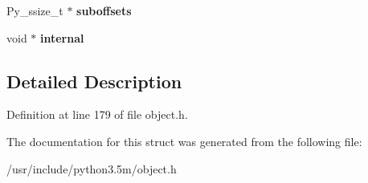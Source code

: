 \begin{DoxyCompactItemize}
\item 
Py\+\_\+ssize\+\_\+t $\ast$ {\bfseries suboffsets}\hypertarget{structbufferinfo_a74e3c815c56f515aa353109f4284f0e6}{}\label{structbufferinfo_a74e3c815c56f515aa353109f4284f0e6}

\item 
void $\ast$ {\bfseries internal}\hypertarget{structbufferinfo_ab238becb9fa7b6940afa059083e4d27e}{}\label{structbufferinfo_ab238becb9fa7b6940afa059083e4d27e}

\end{DoxyCompactItemize}


\subsection{Detailed Description}


Definition at line 179 of file object.\+h.



The documentation for this struct was generated from the following file\+:\begin{DoxyCompactItemize}
\item 
/usr/include/python3.\+5m/object.\+h\end{DoxyCompactItemize}
